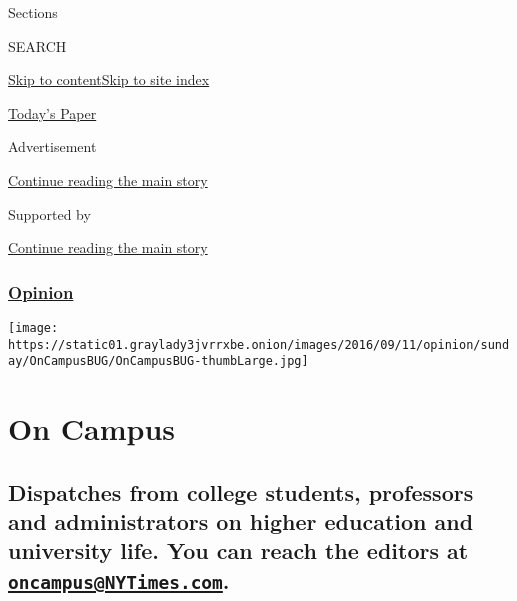 Sections

SEARCH

\protect\hyperlink{site-content}{Skip to
content}\protect\hyperlink{site-index}{Skip to site index}

\href{https://myaccount.nytimes3xbfgragh.onion/auth/login?response_type=cookie\&client_id=vi}{}

\href{https://www.nytimes3xbfgragh.onion/section/todayspaper}{Today's
Paper}

Advertisement

\protect\hyperlink{after-top}{Continue reading the main story}

Supported by

\protect\hyperlink{after-sponsor}{Continue reading the main story}

\hypertarget{opinion}{%
\subsubsection{\texorpdfstring{\href{/section/opinion}{Opinion}}{Opinion}}\label{opinion}}

\texttt{[image: https://static01.graylady3jvrrxbe.onion/images/2016/09/11/opinion/sunday/OnCampusBUG/OnCampusBUG-thumbLarge.jpg]}

\hypertarget{on-campus}{%
\section{On Campus}\label{on-campus}}

\hypertarget{dispatches-from-college-students-professors-and-administrators-on-higher-education-and-university-life-you-can-reach-the-editors-at-oncampusnytimescom}{%
\subsection{\texorpdfstring{Dispatches from college students, professors
and administrators on higher education and university life. You can
reach the editors at
\href{mailto:oncampus@NYTimes.com}{\nolinkurl{oncampus@NYTimes.com}}.}{Dispatches from college students, professors and administrators on higher education and university life. You can reach the editors at oncampus@NYTimes.com.}}\label{dispatches-from-college-students-professors-and-administrators-on-higher-education-and-university-life-you-can-reach-the-editors-at-oncampusnytimescom}}

